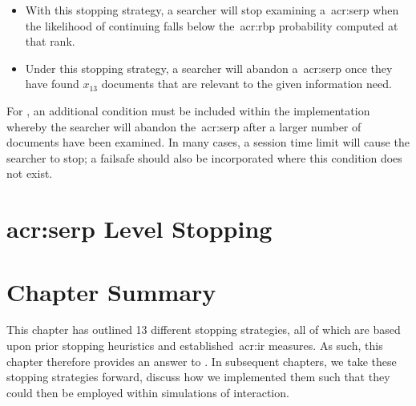 \begin{itemize}
    \item{ With this stopping strategy, a searcher will stop examining a~\gls{acr:serp} when the likelihood of continuing falls below the~\gls{acr:rbp} probability computed at that rank.}
    
    \item{ Under this stopping strategy, a searcher will abandon a~\gls{acr:serp} once they have found $x_{13}$ documents that are relevant to the given information need.}
\end{itemize}

For , an additional condition must be included within the implementation whereby the searcher will abandon the~\gls{acr:serp} after a larger number of documents have been examined. In many cases, a session time limit will cause the searcher to stop; a failsafe should also be incorporated where this condition does not exist.

\section{\gls{acr:serp} Level Stopping}

\section{Chapter Summary}
This chapter has outlined 13 different stopping strategies, all of which are based upon prior stopping heuristics and established~\gls{acr:ir} measures. As such, this chapter therefore provides an answer to . In subsequent chapters, we take these stopping strategies forward, discuss how we implemented them such that they could then be employed within simulations of interaction.